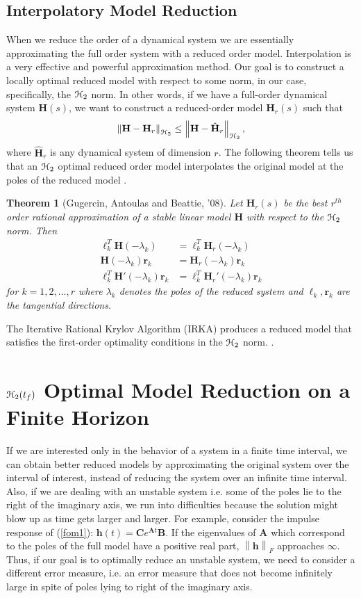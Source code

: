 \documentclass[preprint]{elsarticle}
\newtheorem{theorem}{Theorem}[section]
\theoremstyle{definition}
\theoremstyle{definition}
\def\mathcal{\EuScript}
\numberwithin{equation}{section}
\newcommand{\A}{\mathbf{A}}
\newcommand{\B}{\mathbf{B}}
\newcommand{\C}{\mathbf{C}}
\newcommand{\HH}{\mathbf{H}}
\newcommand{\h}{\mathbf{h}}
\newcommand{\tf}{t_f}
\newcommand{\rc}{\boldsymbol{r}}
\newcommand{\lc}{\boldsymbol{\ell}}
\newcommand{\ch}{\mathcal{H}}
\newcommand{\norm}[1]{\left\lVert#1\right\rVert}
\begin{document}
\subsection{Interpolatory Model Reduction}
When we reduce the order of a dynamical system we are essentially approximating the full order system with a reduced order model. Interpolation is a very effective and powerful approximation method.
Our goal is to construct a locally optimal reduced model with respect to some norm, in our case, specifically, the $\ch_2$ norm. In other words, if we have a full-order dynamical system $\HH(s)$, we want to construct a reduced-order model $\HH_r(s)$ such that
\begin{align*}
\norm{\HH-\HH_r}_{\ch_2} \leq \norm{\HH-\hat{\HH}_r}_{\ch_2}, 
\end{align*}
where ${\hat{\HH}_r}$  is any dynamical system of dimension $r$. 
The following theorem tells us that an $\ch_2$ optimal reduced order model interpolates the original model at the poles of the reduced model \cite{GugBA08, MeiL67}. 
\begin{theorem}[Gugercin, Antoulas and Beattie, '08] \label{h2thm}
Let $\HH_r(s)$ be the best $r^{th}$ order rational approximation of a stable linear model $\HH$ with respect to the $\ch_2$ norm. Then
\begin{align*}
\lc_k^T\HH(-\lambda_k)&=\lc_k^T\HH_r(-\lambda_k)\\
\HH(-\lambda_k)\rc_k&=\HH_r(-\lambda_k)\rc_k\\
\lc_k^T\HH'(-\lambda_k)\rc_k&=\lc_k^T\HH_r'(-\lambda_k)\rc_k
\end{align*}
for $k=1, 2, ... , r$ where $\lambda_k$ denotes the poles of the reduced system and $\lc_k, \rc_k$ are the tangential directions.
\end{theorem}
The Iterative Rational Krylov Algorithm (IRKA) produces a reduced model that satisfies the first-order optimality
conditions in the $\ch_2$ norm. \cite{GugBA08}. 

\section{$\ch_2(\tf)$ Optimal Model Reduction on a Finite Horizon}  \label{sec:main} 
If we are interested only in the behavior of a system in a finite time interval, we can obtain better reduced models by approximating the original system over the interval of interest, instead of  reducing the system over an infinite time interval.
Also, if we are dealing with an unstable system i.e. some of the poles lie to the right of the imaginary axis, we run into difficulties because the solution might blow up as time gets larger and larger. For example, consider the impulse response of (\ref{fom1}): $\h(t)=\C e^{\A t}\B$. If the eigenvalues of $\A$ which correspond to the poles of the full model have a positive real part, $\norm{\h}_F$ approaches $\infty$. 
Thus, if our goal is to optimally reduce an unstable system, we need to consider a different error measure, i.e. an error measure that does not become infinitely large in spite of poles lying to right of the imaginary axis. 
\end{document}
